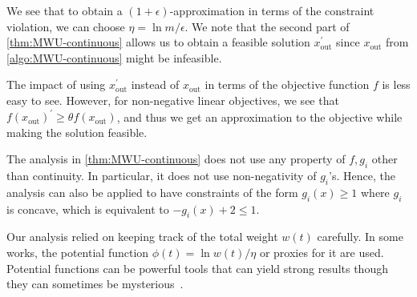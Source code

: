 We see that to obtain a \((1 + \epsilon )\)-approximation in terms of the constraint violation, we can choose \(\eta = \ln m / \epsilon \). We note that the second part of \autoref{thm:MWU-continuous} allows us to obtain a feasible solution \(x_{\text{out} }^{\prime} \) since \(x_{\text{out} }\) from \autoref{algo:MWU-continuous} might be infeasible.

\begin{intuition}
	The impact of using \(x_{\text{out} }^{\prime} \) instead of \(x_{\text{out} }\) in terms of the objective function \(f\) is less easy to see. However, for non-negative linear objectives, we see that \(f(x_{\text{out} })^{\prime} \geq \theta f(x_{\text{out} })\), and thus we get an approximation to the objective while making the solution feasible.
\end{intuition}

\begin{remark}
	The analysis in \autoref{thm:MWU-continuous} does not use any property of \(f, g_i\) other than continuity. In particular, it does not use non-negativity of \(g_i\)'s. Hence, the analysis can also be applied to have constraints of the form \(g_i(x) \geq 1 \) where \(g_i\) is concave, which is equivalent to \(- g_i(x) + 2 \leq 1\).
\end{remark}

\begin{note}
	Our analysis relied on keeping track of the total weight \(w(t)\) carefully. In some works, the potential function \(\phi (t) = \ln w(t) / \eta \) or proxies for it are used. Potential functions can be powerful tools that can yield strong results though they can sometimes be mysterious~\cite{bansal2017potential}.
\end{note}